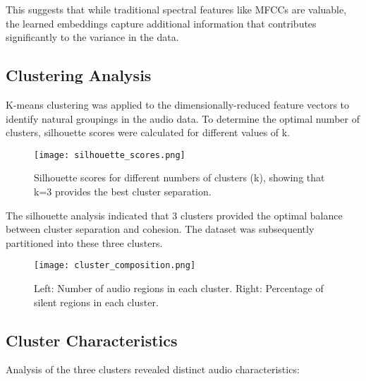 \documentclass[11pt,a4paper]{article}
\begin{document}
This suggests that while traditional spectral features like MFCCs are valuable, the learned embeddings capture additional information that contributes significantly to the variance in the data.

\subsection{Clustering Analysis}

K-means clustering was applied to the dimensionally-reduced feature vectors to identify natural groupings in the audio data. To determine the optimal number of clusters, silhouette scores were calculated for different values of k.

\begin{figure}[H]
    \centering
    \texttt{[image: silhouette\_scores.png]}
    \caption{Silhouette scores for different numbers of clusters (k), showing that k=3 provides the best cluster separation.}
    \label{fig:silhouette}
\end{figure}

The silhouette analysis indicated that 3 clusters provided the optimal balance between cluster separation and cohesion. The dataset was subsequently partitioned into these three clusters.

\begin{figure}[H]
    \centering
    \texttt{[image: cluster\_composition.png]}
    \caption{Left: Number of audio regions in each cluster. Right: Percentage of silent regions in each cluster.}
    \label{fig:cluster_comp}
\end{figure}

\subsection{Cluster Characteristics}

Analysis of the three clusters revealed distinct audio characteristics:
\end{document}
